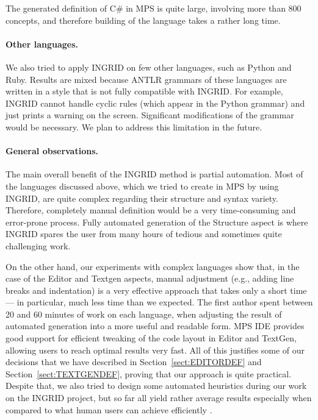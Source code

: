 The generated definition of C\# in MPS is quite large, involving more than 800 concepts, and therefore building of the language takes a rather long time.

\paragraph{Other languages.}
We also tried to apply INGRID on few other languages, such as Python and Ruby.
Results are mixed because ANTLR grammars of these languages are written in a style that is not fully compatible with INGRID.
For example, INGRID cannot handle cyclic rules (which appear in the Python grammar) and just prints a warning on the screen.
Significant modifications of the grammar would be necessary.
We plan to address this limitation in the future.

\paragraph{General observations.}
The main overall benefit of the INGRID method is partial automation.
Most of the languages discussed above, which we tried to create in MPS by using INGRID, are quite complex regarding their structure and syntax variety.
Therefore, completely manual definition would be a very time-consuming and error-prone process.
Fully automated generation of the Structure aspect is where INGRID spares the user from many hours of tedious and sometimes quite challenging work.

On the other hand, our experiments with complex languages show that, in the case of the Editor and Textgen aspects, manual adjustment (e.g., adding line breaks and indentation) is a very effective approach that takes only a short time --- in particular, much less time than we expected.
The first author spent between 20 and 60 minutes of work on each language, when adjusting the result of automated generation into a more useful and readable form.
MPS IDE provides good support for efficient tweaking of the code layout in Editor and TextGen, allowing users to reach optimal results very fast.
All of this justifies some of our decisions that we have described in Section~\ref{sect:EDITORDEF} and Section~\ref{sect:TEXTGENDEF}, proving that our approach is quite practical.
Despite that, we also tried to design some automated heuristics during our work on the INGRID project, but so far all yield rather average results especially when compared to what human users can achieve efficiently .

